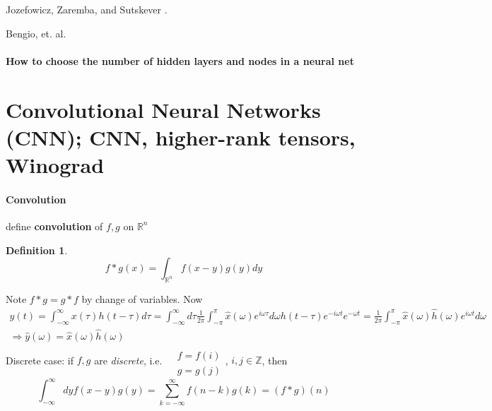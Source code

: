 \documentclass[10pt]{amsart}
\newtheorem{definition}{Definition}
\begin{document}
\begin{multicols*}{2}
Jozefowicz, Zaremba, and Sutskever \cite{JZS2015}.  

Bengio, et. al. \cite{GBC2016}



\subsection{How to choose the number of hidden layers and nodes in a neural net}


\part{Convolutional Neural Networks (CNN); CNN, higher-rank tensors, Winograd}



\subsection*{Convolution}
define \textbf{convolution} of $f,g$ on $\mathbb{R}^n$
\begin{definition}
	\begin{equation}  f* g(x) = \int_{ \mathbb{R}^n } f(x-y)g(y)dy \end{equation}
\end{definition}
Note $f*g = g*f$ by change of variables.  
Now
\[
\begin{gathered}
y(t) = \int_{-\infty}^{\infty}x(\tau)h(t-\tau)d\tau = \int_{-\infty}^{\infty} d\tau \frac{1}{2\pi} \int_{-\pi}^{\pi} \widehat{x}(\omega) e^{i\omega \tau} d\omega h(t-\tau) e^{-i \omega t} e^{-\omega t} = \frac{1}{2\pi} \int_{-\pi}^{\pi} \widehat{x}(\omega) \widehat{h}(\omega) e^{i\omega t} d\omega \\ 
\Longrightarrow \widehat{y}(\omega) = \widehat{x}(\omega) \widehat{h}(\omega)
\end{gathered}
\]
Discrete case: if $f,g$ are \emph{discrete}, i.e. $\begin{aligned} & \quad \\
& f = f(i) \\
& g = g(j) \end{aligned}$, $i,j \in \mathbb{Z}$, then
\[
\int_{-\infty}^{\infty} dy f(x-y)g(y) = \sum_{k=-\infty}^{\infty} f(n-k) g(k) = (f*g)(n)
\]

\end{multicols*}
\end{document}
